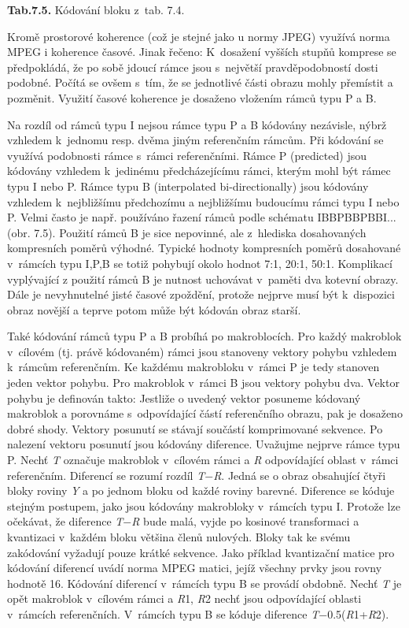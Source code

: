 \textbf{Tab.7.5.} Kódování bloku z~tab. 7.4.

\noindent Kromě prostorové koherence (což je stejné jako u normy JPEG) využívá norma MPEG i koherence časové. Jinak řečeno: K~dosažení vyšších stupňů komprese se předpokládá, že po sobě jdoucí rámce jsou s~největší pravděpodobností dosti podobné. Počítá se ovšem s~tím, že se jednotlivé části obrazu mohly přemístit a pozměnit. Využití časové koherence je dosaženo vložením rámců typu P a B.

\noindent 

\noindent 

\noindent Na rozdíl od rámců typu I nejsou rámce typu P a B kódovány nezávisle, nýbrž vzhledem k~jednomu resp. dvěma jiným referenčním rámcům. Při kódování se využívá podobnosti rámce s~rámci referenčními. Rámce P (predicted) jsou kódovány vzhledem k~jedinému předcházejícímu rámci, kterým mohl být rámec typu I nebo P. Rámce typu B (interpolated bi-directionally) jsou kódovány vzhledem k~nejbližšímu předchozímu a nejbližšímu budoucímu rámci typu I nebo P. Velmi často je např. používáno řazení rámců podle schématu IBBPBBPBBI... (obr. 7.5). Použití rámců B je sice nepovinné, ale z~hlediska dosahovaných kompresních poměrů výhodné. Typické hodnoty kompresních poměrů dosahované v~rámcích typu I,P,B se totiž pohybují okolo hodnot 7:1, 20:1, 50:1. Komplikací vyplývající z použití rámců B je nutnost uchovávat v~paměti dva kotevní obrazy. Dále je nevyhnutelné jisté časové zpoždění, protože  nejprve musí být k~dispozici obraz novější a teprve potom může být kódován obraz starší.

\noindent 

\noindent 

\noindent Také kódování rámců typu P a B probíhá po makroblocích. Pro každý makroblok v~cílovém (tj. právě kódovaném) rámci jsou stanoveny vektory pohybu vzhledem k~rámcům referenčním. Ke každému makrobloku v~rámci P je tedy stanoven jeden vektor pohybu. Pro makroblok v~rámci B jsou vektory pohybu dva. Vektor pohybu je definován takto: Jestliže o uvedený vektor posuneme kódovaný makroblok a porovnáme s~odpovídající částí referenčního obrazu, pak je dosaženo dobré shody. Vektory posunutí se stávají součástí komprimované sekvence. Po nalezení vektoru posunutí jsou kódovány diference. Uvažujme nejprve rámce typu P. Nechť \textit{T} označuje makroblok v~cílovém rámci a \textit{R} odpovídající oblast v~rámci referenčním. Diferencí se rozumí rozdíl \textit{T}$-$\textit{R}. Jedná se o obraz obsahující čtyři bloky roviny \textit{Y} a po jednom bloku od každé roviny barevné. Diference se kóduje stejným postupem, jako jsou kódovány makrobloky v~rámcích typu I. Protože lze očekávat, že diference \textit{T}$-$\textit{R} bude malá, vyjde po kosinové transformaci a kvantizaci v~každém bloku většina členů nulových. Bloky tak ke svému zakódování vyžadují pouze krátké sekvence. Jako příklad kvantizační matice pro kódování diferencí uvádí norma MPEG matici, jejíž všechny prvky jsou rovny hodnotě 16. Kódování diferencí v~rámcích typu B se provádí obdobně. Nechť \textit{T} je opět makroblok v~cílovém rámci a \textit{R}1, \textit{R}2 nechť jsou odpovídající oblasti v~rámcích referenčních. V~rámcích typu B se kóduje diference \textit{T}$-$0.5(\textit{R}1+\textit{R}2).

